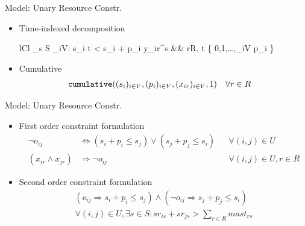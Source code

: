 \documentclass{beamer}
\begin{document}
\begin{frame}{Model: Unary Resource Constr.}
	\begin{itemize}
		\item Time-indexed decomposition
		\begin{IEEEeqnarray}{lCl}
		    \sum\nolimits_{s \in  S} \sum\nolimits_{i\in V: s_i \leq t < s_i + p_i} y_{ir}^s  
		    &\hspace{2mm}& \forall r\in R, \forall t \in \left\{ 0,1,\ldots,\sum\nolimits_{i\in V} p_i \right\} \nonumber
		\end{IEEEeqnarray}\pause
		\vspace{3mm}
		\item Cumulative
		\begin{align}
		    & {\tt cumulative}((s_{i})_{i\in V}, (p_{i})_{i\in V}, 
		        (x_{ir})_{i\in V}, 1)
		    && \forall r\in R \nonumber
		\end{align}
	\end{itemize}
\end{frame}

\begin{frame}{Model: Unary Resource Constr.}
	\begin{itemize}
		\item First order constraint formulation
		\begin{align}
		    \neg o_{ij} 
		    & \Leftrightarrow (s_{i} + p_{i} \leq s_{j}) \vee (s_{j} + p_{j} \leq s_{i})
		    && \forall (i, j) \in U \nonumber\\
		    (x_{ir} \wedge x_{jr}) 
		    & \Rightarrow \neg o_{ij}
		    && \forall (i, j) \in U, r\in R\nonumber
		\end{align}\pause
		\vspace{3mm}
		\item Second order constraint formulation
		\begin{multline}
		    (o_{ij} \Rightarrow s_i + p_{i} \leq s_{j}) \wedge
		    (\neg o_{ij} \Rightarrow s_{j} + p_{j} \leq s_{i})
		    \\
		    \forall (i, j) \in U, \exists s\in S: 
		        sr_{is} + sr_{js} > \sum\nolimits_{r\in R} mast_{rs}\nonumber
		\end{multline}
	\end{itemize}
\end{frame}


\end{document}

